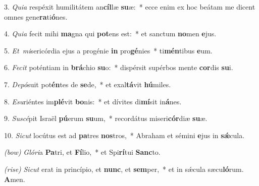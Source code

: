 3. \textit{Quia} respéxit humilitátem an\textbf{cíl}læ \textbf{su}æ:~*
	ecce enim ex hoc beátam me dicent omnes gene\textbf{ra}ti\textbf{ó}nes.

4. \textit{Quia} fecit mihi \textbf{ma}gna qui \textbf{pot}ens est:~*
	et sanctum \textbf{no}men \textbf{e}jus.

5. \textit{Et\ mi}sericórdia ejus a progénie \textbf{in} pro\textbf{gé}nies~*
	ti\textbf{mén}tibus \textbf{e}um.

6. \textit{Fecit} poténtiam in \textbf{brá}chio \textbf{su}o:~*
	dispérsit supérbos mente \textbf{cor}dis \textbf{su}i.

7. \textit{Depó}suit pot\textbf{én}tes de \textbf{se}de,~*
	et exal\textbf{tá}vit \textbf{hú}miles.

8. \textit{Esu}riéntes im\textbf{plé}vit \textbf{bo}nis:~*
	et dívites di\textbf{mí}sit in\textbf{á}nes.

9. \textit{Suscé}pit Israël \textbf{pú}erum \textbf{su}um,~*
	recordátus miseri\textbf{cór}diæ \textbf{su}æ.

10. \textit{Sicut} locútus est ad \textbf{pa}tres \textbf{nos}tros,~*
	Abraham et sémini \textbf{e}jus in \textbf{s\'{\ae}}cula.

\textit{(bow)} \textit{Glóri}a \textbf{Pa}tri, et \textbf{Fí}lio,~*
	et Spi\textbf{rí}tui \textbf{Sanc}to.
	
\textit{(rise)} \textit{Sicut} erat in princípio, et \textbf{nunc}, et \textbf{sem}per,~*
	et in s\'{\ae}cula sæcu\textbf{ló}rum. \textbf{A}men.